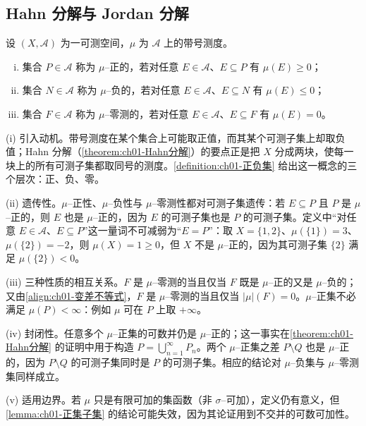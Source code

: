 \documentclass[../../main.tex]{subfiles}%
\begin{document}
\subsection{Hahn 分解与 Jordan 分解}\label{subsection:ch01-HahnJordan}\label{subsection:ch01-全变差}

\begin{definition}\label{definition:ch01-正负集}
设 $(X,\mathcal{A})$ 为一可测空间，$\mu$ 为 $\mathcal{A}$ 上的带号测度。
\begin{enumerate}[(i)]
\item 集合 $P\in\mathcal{A}$ 称为 $\mu$--正的，若对任意 $E\in\mathcal{A}$、$E\subseteq P$ 有 $\mu(E)\geqslant0$；
\item 集合 $N\in\mathcal{A}$ 称为 $\mu$--负的，若对任意 $E\in\mathcal{A}$、$E\subseteq N$ 有 $\mu(E)\leqslant0$；
\item 集合 $F\in\mathcal{A}$ 称为 $\mu$--零测的，若对任意 $E\in\mathcal{A}$、$E\subseteq F$ 有 $\mu(E)=0$。
\end{enumerate}
\end{definition}

\begin{remark}\label{remark:ch01-正负集动机}
(i) 引入动机。带号测度在某个集合上可能取正值，而其某个可测子集上却取负值；Hahn 分解（\cref{theorem:ch01-Hahn分解}）的要点正是把 $X$ 分成两块，使每一块上的所有可测子集都取同号的测度。\cref{definition:ch01-正负集} 给出这一概念的三个层次：正、负、零。

(ii) 遗传性。$\mu$--正性、$\mu$--负性与 $\mu$--零测性都对可测子集遗传：若 $E\subseteq P$ 且 $P$ 是 $\mu$--正的，则 $E$ 也是 $\mu$--正的，因为 $E$ 的可测子集也是 $P$ 的可测子集。定义中“对任意 $E\in\mathcal{A}$、$E\subseteq P$”这一量词不可减弱为“$E=P$”：取 $X=\{1,2\}$、$\mu(\{1\})=3$、$\mu(\{2\})=-2$，则 $\mu(X)=1\geqslant0$，但 $X$ 不是 $\mu$--正的，因为其可测子集 $\{2\}$ 满足 $\mu(\{2\})<0$。

(iii) 三种性质的相互关系。$F$ 是 $\mu$--零测的当且仅当 $F$ 既是 $\mu$--正的又是 $\mu$--负的；又由\eqref{align:ch01-变差不等式}，$F$ 是 $\mu$--零测的当且仅当 $|\mu|(F)=0$。$\mu$--正集不必满足 $\mu(P)<\infty$：例如 $\mu$ 可在 $P$ 上取 $+\infty$。

(iv) 封闭性。任意多个 $\mu$--正集的可数并仍是 $\mu$--正的；这一事实在\cref{theorem:ch01-Hahn分解} 的证明中用于构造 $P=\bigcup_{n=1}^\infty P_n$。两个 $\mu$--正集之差 $P\setminus Q$ 也是 $\mu$--正的，因为 $P\setminus Q$ 的可测子集同时是 $P$ 的可测子集。相应的结论对 $\mu$--负集与 $\mu$--零测集同样成立。

(v) 适用边界。若 $\mu$ 只是有限可加的集函数（非 $\sigma$--可加），定义仍有意义，但\cref{lemma:ch01-正集子集} 的结论可能失效，因为其论证用到不交并的可数可加性。
\end{remark}
\end{document}
